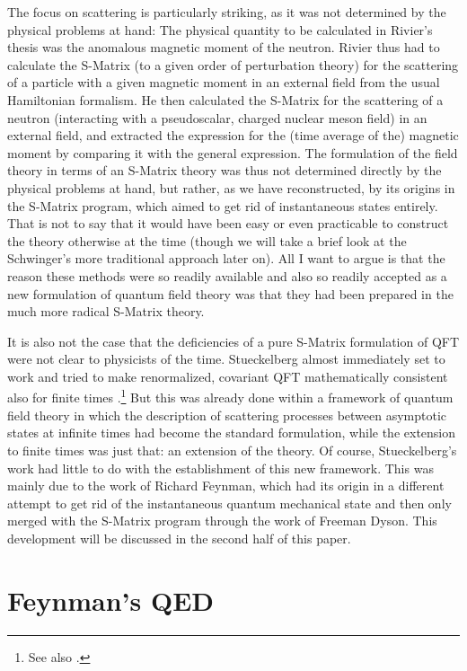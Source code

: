 \documentclass[12pt]{article}
\begin{document}
The focus on scattering is particularly striking, as it was not determined by the physical problems at hand: The physical quantity to be calculated in Rivier's thesis was the anomalous magnetic moment of the neutron. Rivier thus had to calculate the S-Matrix (to a given order of perturbation theory) for the scattering of a particle with a given magnetic moment in an external field from the usual Hamiltonian formalism. He then calculated the S-Matrix for the scattering of a neutron (interacting with a pseudoscalar, charged nuclear meson field) in an external field, and extracted the expression for the (time average of the) magnetic moment by comparing it with the general expression. The formulation of the field theory in terms of an S-Matrix theory was thus not determined directly by the physical problems at hand, but rather, as we have reconstructed, by its origins in the S-Matrix program, which aimed to get rid of instantaneous states entirely. That is not to say that it would have been easy or even practicable to construct the theory otherwise at the time (though we will take a brief look at the Schwinger's more traditional approach later on). All I want to argue is that the reason these methods were so readily available and also so readily accepted as a new formulation of quantum field theory was that they had been prepared in the much more radical S-Matrix theory.

It is also not the case that the deficiencies of a pure S-Matrix formulation of QFT were not clear to physicists of the time. Stueckelberg almost immediately set to work and tried to make renormalized, covariant QFT mathematically consistent also for finite times \citep{stueckelberg_1951_relativistic}.\footnote{See also \citep{cianfrani_2008_stueckelberg}.} But this was already done within a framework of quantum field theory in which the description of scattering processes between asymptotic states at infinite times had become the standard formulation, while the extension to finite times was just that: an extension of the theory. Of course, Stueckelberg's work had little to do with the establishment of this new framework. This was mainly due to the work of Richard Feynman, which had its origin in a different attempt to get rid of the instantaneous quantum mechanical state and then only merged with the S-Matrix program through the work of Freeman Dyson. This development will be discussed in the second half of this paper.

  
 
\section{Feynman's QED}
\end{document}
